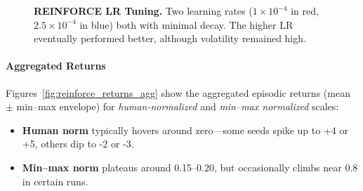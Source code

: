 \begin{figure}[htbp]
	\centering
	\quad
	\caption{\textbf{REINFORCE LR Tuning.} Two learning rates ($1\times10^{-4}$ in red, $2.5\times10^{-4}$ in blue) 
		both with minimal decay. The higher LR eventually performed better, although volatility remained high.}
	\label{fig:reinforce_lr_tuning}
\end{figure}

\paragraph{Aggregated Returns}
Figures~\ref{fig:reinforce_returns_agg} show the aggregated episodic returns (mean $\pm$ min–max envelope) 
for \emph{human‐normalized} and \emph{min--max normalized} scales:
\begin{itemize}
	\item \textbf{Human norm} typically hovers around zero—some seeds spike up to +4 or +5, others dip to -2 or -3.
	\item \textbf{Min--max norm} plateaus around 0.15--0.20, but occasionally climbs near 0.8 in certain runs.
\end{itemize}

